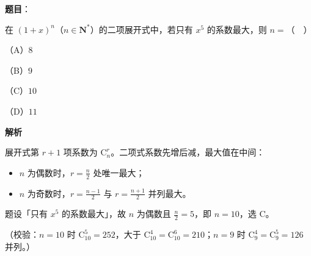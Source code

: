 \begin{answer}

\textbf{题目}：

在 $(1+x)^n$（$n\in\mathbf N^*$）的二项展开式中，若只有 $x^5$ 的系数最大，则 $n=$（　）

（A）$8$

（B）$9$

（C）$10$

（D）$11$

\textbf{解析}

展开式第 $r+1$ 项系数为 $\mathrm C_n^r$。二项式系数先增后减，最大值在中间：

\begin{itemize}
\item $n$ 为偶数时，$r=\frac n2$ 处唯一最大；
\item $n$ 为奇数时，$r=\frac{n-1}{2}$ 与 $r=\frac{n+1}{2}$ 并列最大。
\end{itemize}

题设「只有 $x^5$ 的系数最大」，故 $n$ 为偶数且 $\frac n2=5$，即 $n=10$，选 C。

（校验：$n=10$ 时 $\mathrm C_{10}^5=252$，大于 $\mathrm C_{10}^4=\mathrm C_{10}^6=210$；$n=9$ 时 $\mathrm C_9^4=\mathrm C_9^5=126$ 并列。）


\end{answer}

